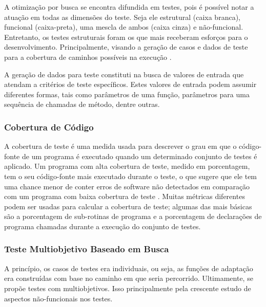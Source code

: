 A otimização por busca se encontra difundida em testes, pois é possível notar a atuação em todas as dimensões do teste. Seja ele estrutural (caixa branca), funcional (caixa-preta), uma mescla de ambos (caixa cinza) e não-funcional. Entretanto, os testes estruturais foram os que mais receberam esforços para o desenvolvimento. Principalmente, visando a geração de casos e dados de teste para a cobertura de caminhos possíveis na execução \cite{khari2017extensive}. 

A geração de dados para teste constituti na busca de valores de entrada que atendam a critérios de teste específicos. Estes valores de entrada podem assumir diferentes formas, tais como parâmetros de uma função, parâmetros para uma sequência de chamadas de método, dentre outras.



\subsubsection{Cobertura de Código}

A cobertura de teste é uma medida usada para descrever o grau em que o código-fonte de um programa é executado quando um determinado conjunto de testes é aplicado. Um programa com alta cobertura de teste, medido em porcentagem, tem o seu código-fonte mais executado durante o teste, o que sugere que ele tem uma chance menor de conter erros de software não detectados em comparação com um programa com baixa cobertura de teste \cite{yang2009survey}. Muitas métricas diferentes podem ser usadas para calcular a cobertura de teste; algumas das mais básicas são a porcentagem de sub-rotinas de programa e a porcentagem de declarações de programa chamadas durante a execução do conjunto de testes.

\subsubsection{Teste Multiobjetivo Baseado em Busca}

A princípio, os casos de testes era individuais, ou seja, as funções de adaptação era construídas com base no caminho em que seria percorrido. Ultimamente, se propõe testes com multiobjetivos. Isso principalmente pela crescente estudo de aspectos não-funcionais nos testes.









